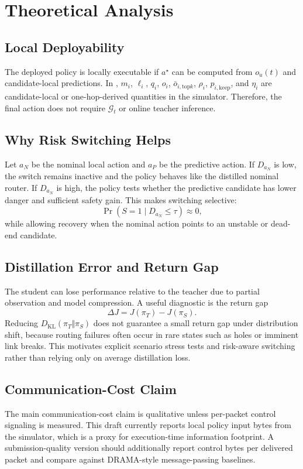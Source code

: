 \section{Theoretical Analysis}
\label{sec:analysis}

\subsection{Local Deployability}
The deployed policy is locally executable if $a^\star$ can be computed from $o_u(t)$ and candidate-local predictions. In \method, $m_i$, $\ell_i$, $q_i$, $o_i$, $\bar{o}_{i,\mathrm{top}k}$, $\rho_i$, $p_{i,\mathrm{keep}}$, and $\eta_i$ are candidate-local or one-hop-derived quantities in the simulator. Therefore, the final action does not require $\mathcal{G}_t$ or online teacher inference.

\subsection{Why Risk Switching Helps}
Let $a_N$ be the nominal local action and $a_P$ be the predictive action. If $D_{a_N}$ is low, the switch remains inactive and the policy behaves like the distilled nominal router. If $D_{a_N}$ is high, the policy tests whether the predictive candidate has lower danger and sufficient safety gain. This makes switching selective:
\begin{equation}
\Pr(S=1\mid D_{a_N}\le \tau)\approx 0,
\end{equation}
while allowing recovery when the nominal action points to an unstable or dead-end candidate.

\subsection{Distillation Error and Return Gap}
The student can lose performance relative to the teacher due to partial observation and model compression. A useful diagnostic is the return gap
\begin{equation}
\Delta J=J(\pi_T)-J(\pi_S).
\end{equation}
Reducing $D_{\mathrm{KL}}(\pi_T\Vert\pi_S)$ does not guarantee a small return gap under distribution shift, because routing failures often occur in rare states such as holes or imminent link breaks. This motivates explicit scenario stress tests and risk-aware switching rather than relying only on average distillation loss.

\subsection{Communication-Cost Claim}
The main communication-cost claim is qualitative unless per-packet control signaling is measured. This draft currently reports local policy input bytes from the simulator, which is a proxy for execution-time information footprint. A submission-quality version should additionally report control bytes per delivered packet and compare against DRAMA-style message-passing baselines.
